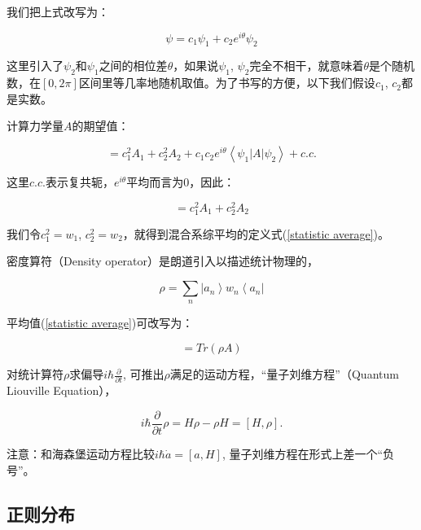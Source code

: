 我们把上式改写为：

\begin{equation*}
\psi = c_1 \psi_1 + c_2 e^{i \theta} \psi_2
\end{equation*}

这里引入了$\psi_2$和$\psi_1$之间的相位差$\theta$，如果说$\psi_1$, $\psi_2$完全不相干，就意味着$\theta$是个随机数，在$[0, 2\pi]$区间里等几率地随机取值。为了书写的方便，以下我们假设$c_1$, $c_2$都是实数。

计算力学量$A$的期望值：

\begin{equation*}
[A] = c_1^2 A_1 + c_2^2 A_2 + c_1 c_2 e^{i \theta} \left\langle \psi_1 | A | \psi_2 \right\rangle + c.c. 
\end{equation*}

这里$c.c.$表示复共轭，$e^{i \theta}$平均而言为0，因此：

\begin{equation*}
[A] = c_1^2 A_1 + c_2^2 A_2
\end{equation*}

我们令$c_1^2 = w_1$, $c_2^2 = w_2$，就得到混合系综平均的定义式(\ref{statistic average})。

密度算符（Density operator）是朗道引入以描述统计物理的，

\begin{equation}\label{statistic operator}
\rho = \sum\limits_n \left| a_n \right\rangle w_n \left\langle a_n \right|
\end{equation}

平均值(\ref{statistic average})可改写为：

\begin{equation}
[A] = Tr (\rho A)
\end{equation}

对统计算符$\rho$求偏导$i\hbar \frac{\partial}{\partial t}$,
可推出$\rho$满足的运动方程，“量子刘维方程”（Quantum Liouville Equation），


\begin{equation}\label{quantum Liouville eqs}
i\hbar \frac{\partial}{\partial t} \rho = H \rho - \rho H = [H,
\rho].
\end{equation}

注意：和海森堡运动方程比较$i\hbar \dot a = [a, H]$,
量子刘维方程在形式上差一个“负号”。

\subsection{正则分布}

